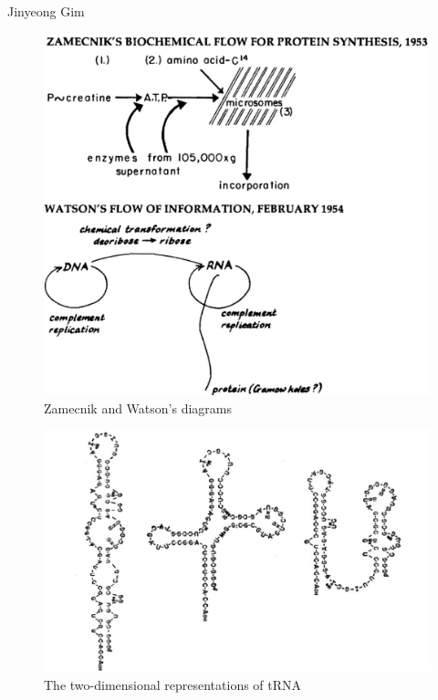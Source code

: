 \begin{artengenv}{Jinyeong Gim}
\begin{figure}[H]
 \begin{center}
 \includegraphics[width=.9\textwidth]{ART_Gim/fig.1300.jpg}%
 \end{center}%
 \caption{Zamecnik and Watson's diagrams
 \parencite[][p.273]{judson_eighth_2013}}\label{gim.fig1}
\end{figure}

\begin{figure}[H]
 \begin{center}
 \includegraphics[width=.8\textwidth]{ART_Gim/fig.2300.jpg}%
 \end{center}%
 \caption{The two-dimensional representations of tRNA
 \parencite[][p.1464]{holley_structure_1965}}\label{gim.fig2}
\end{figure}


\end{artengenv}
